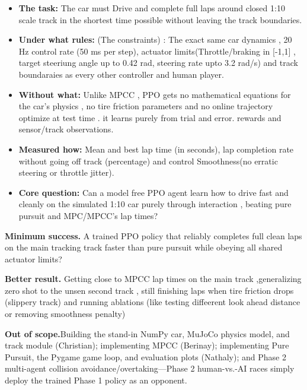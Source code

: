 \documentclass[11pt]{article}
\begin{document}
\begin{itemize}[leftmargin=1.5em, itemsep=0.25em]
    \item \textbf{The task:} The car must Drive and complete full laps around closed 1:10 scale track in the shortest time possible without leaving the track boundaries. 
    \item \textbf{Under what rules:} (The constraints) : The exact same car dynamics , 20 Hz control rate (50 ms per step), actuator limits(Throttle/braking in [-1,1] , target steeriung angle up to 0.42 rad, steering rate upto 3.2 rad/s) and track boundaraies as every other controller and human player.  
    \item \textbf{Without what:} Unlike MPCC , PPO gets no mathematical equations for the car's physics , no tire friction parameters and no online trajectory optimize at test time . it learns purely from trial and error. rewards and sensor/track observations. 
    
    \item \textbf{Measured how:} Mean and best lap time (in seconds), lap completion rate without going off track (percentage) and control Smoothness(no erratic steering or throttle jitter).
    
    \item \textbf{Core question:} Can a model free PPO agent learn how to drive fast and cleanly on the simulated 1:10 car purely through interaction , beating pure pursuit and MPC/MPCC's lap times? 
    
\end{itemize}

\noindent\textbf{Minimum success.} A trained PPO policy that reliably completes full clean laps on the main tracking track faster than pure pursuit while obeying all shared actuator limits? 

\noindent\textbf{Better result.} Getting close to MPCC lap times on the main track ,generalizing zero shot to the unsen second track , still finishing laps when tire friction drops (slippery track) and running ablations (like testing diffeerent look ahead distance or removing smoothness penalty)

\noindent\textbf{Out of scope.}Building the stand-in NumPy car, MuJoCo physics model, and track module (Christian); implementing MPCC (Berinay); implementing Pure Pursuit, the Pygame game loop, and evaluation plots (Nathaly); and Phase 2 multi-agent collision avoidance/overtaking—Phase 2 human-vs.-AI races simply deploy the trained Phase 1 policy as an opponent.
\end{document}
